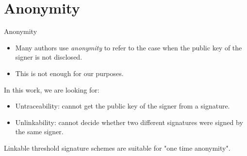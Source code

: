 \section{Anonymity}
\begin{frame}{Anonymity}
\begin{itemize}
\item Many authors use \textit{anonymity} to refer to the case when the public key of the signer is not disclosed.
\item This is not enough for our purposes.
\end{itemize}
In this work, we are looking for:
\begin{itemize}
\item Untraceability: cannot get the public key of the signer from a signature.
\item Unlinkability: cannot decide whether two different signatures were signed by the same signer.
\end{itemize}

Linkable threshold signature schemes are suitable for "one time anonymity".

\end{frame}